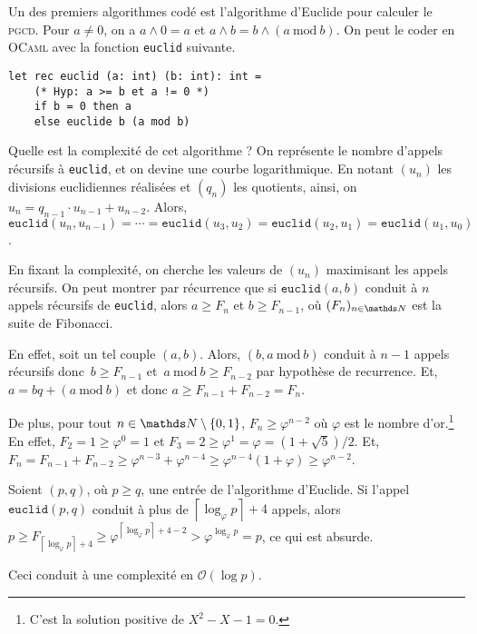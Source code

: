 \documentclass[a4paper]{article}
\begin{document}
	Un des premiers algorithmes codé est l'algorithme d'Euclide pour calculer le \textsc{pgcd}. Pour $a \neq 0$, on a $a \wedge 0 = a$ et $a \wedge b = b \wedge (a\ \mathrm{mod}\ b)$.
	On peut le coder en \textsc{OCaml} avec la fonction \texttt{euclid} suivante.

	\begin{lstlisting}[language=caml,caption=Algorithme d'Euclide calculant le \textsc{pgcd}]
let rec euclid (a: int) (b: int): int =
	(* Hyp: a >= b et a != 0 *)
	if b = 0 then a
	else euclide b (a mod b)
	\end{lstlisting}
	
	Quelle est la complexité de cet algorithme ?
	On représente le nombre d'appels récursifs à \texttt{euclid}, et on devine une courbe logarithmique.
	En notant $(u_n)$ les divisions euclidiennes réalisées et $(q_n)$ les quotients, ainsi, on $u_n = q_{n-1} \cdot u_{n-1} + u_{n-2}$.
	Alors, $\texttt{euclid}(u_n, u_{n-1}) = \cdots = \texttt{euclid}(u_3, u_2) = \texttt{euclid}(u_2, u_1) = \texttt{euclid}(u_1, u_0)$.

	En fixant la complexité, on cherche les valeurs de $(u_n)$ maximisant les appels récursifs.
	On peut montrer par récurrence que si $\texttt{euclid}(a,b)$ conduit à $n$ appels récursifs de \texttt{euclid}, alors $a \ge F_n$ et $b \ge F_{n-1}$, où $(F_n)_{n\in\N}$\/ est la suite de Fibonacci.

	En effet, soit un tel couple $(a,b)$. Alors, $(b, a\ \mathrm{mod}\ b)$ conduit à $n - 1$ appels récursifs donc~$b \ge F_{n-1}$ et~$a\ \mathrm{mod}\ b \ge F_{n-2}$ par hypothèse de recurrence.
	Et, $a = bq + (a\ \mathrm{mod}\ b)$ et donc $a \ge F_{n-1} + F_{n-2} = F_n$.

	De plus, pour tout $n \in \N \setminus \{0,1\}$, $F_n \ge \varphi^{n-2}$ où $\varphi$ est le nombre d'or.\footnote{C'est la solution positive de $X^2 - X - 1 = 0$.}
	En effet, $F_2 = 1 \ge \varphi^0 = 1$ et $F_3 = 2 \ge \varphi^1 = \varphi = (1 + \sqrt{5}) / 2$. Et, $F_n = F_{n-1} + F_{n-2} \ge \varphi^{n-3} + \varphi^{n-4} \ge \varphi^{n-4}(1 + \varphi) \ge \varphi^{n-2}$.

	Soient $(p,q)$, où $p \ge q$, une entrée de l'algorithme d'Euclide. Si l'appel $\texttt{euclid}(p,q)$ conduit à plus de $\left\lceil \log_\varphi p \right\rceil + 4$ appels, alors $p \ge F_{\left\lceil \log_\varphi p \right\rceil + 4} \ge \varphi^{\left\lceil \log_\varphi p \right\rceil + 4 - 2} > \varphi^{\log_\varphi p} = p$, ce qui est absurde.

	Ceci conduit à une complexité en $\mathcal{O}(\log p)$.
\end{document}
